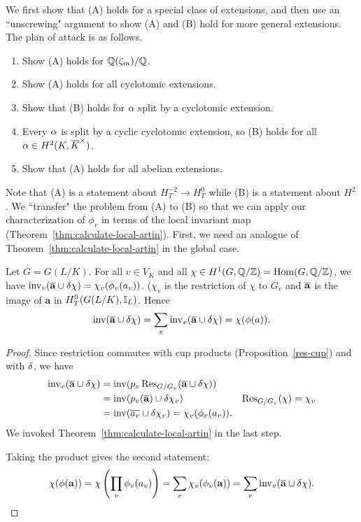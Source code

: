 We first show that (A) holds for a special class of extensions, and then use an ``unscrewing" argument to show (A) and (B) hold for more general extensions. The plan of attack is as follows.
\begin{enumerate}
\item
Show (A) holds for $\mathbb{Q}(\zeta_m)/\mathbb{Q}$.
\item 
Show (A) holds for all cyclotomic extensions.
\item
Show that (B) holds for $\alpha$ split by a cyclotomic extension.
\item
Every $\alpha$ is split by a cyclic cyclotomic extension, so (B) holds for all $\alpha\in H^2(K,\overline{K}^{\times})$.
\item
Show that (A) holds for all abelian extensions.
\end{enumerate}
Note that (A) is a statement about $H_T^{-2}\to H_T^0$ while (B) is a statement about $H^2$. We ``transfer" the problem from (A) to (B) so that we can apply our characterization of $\phi_v$ in terms of the local invariant map (Theorem~\ref{thm:calculate-local-artin}). First, we need an analogue of Theorem~\ref{thm:calculate-local-artin} in the global case.
\begin{lem}
Let $G=G(L/K)$. 
For all $v\in V_K$ and all $\chi\in H^1(G,\mathbb{Q}/\mathbb{Z})=\operatorname{Hom}(G,\mathbb{Q}/\mathbb{Z})$, we have $\operatorname{inv}_v(\overline{\mathbf a}\cup \delta \chi)=\chi_v(\phi_v(a_v))$. ($\chi_v$ is the restriction of $\chi$ to $G_v$ and $\overline{\mathbf a}$ is the image of $\mathbf a$ in $H_T^0(G(L/K),\mathbb{I}_L)$. Hence
\[
\operatorname{inv}(\overline{\mathbf a}\cup \delta \chi)=\sum_v \operatorname{inv}_v(\overline{\mathbf a}\cup \delta \chi)=\chi(\phi(a)).
\]
\end{lem}
\begin{proof}
Since restriction commutes with cup products (Proposition~\ref{res-cup}) and with $\delta$, we have
\begin{align*}
\operatorname{inv}_v(\overline{\mathbf a}\cup \delta \chi)&=\operatorname{inv}(p_v\operatorname{Res}_{G/G_v} (\overline{\mathbf a}\cup \delta \chi))\\
&=\operatorname{inv}(p_v(\overline{\mathbf a})\cup \delta\chi_v)&\operatorname{Res}_{G/G_v}(\chi)=\chi_v\\
&=\operatorname{inv}(\overline{a_v}\cup \delta \chi_v)=\chi_v(\phi_v(a_v)).
\end{align*}
We invoked Theorem~\ref{thm:calculate-local-artin}  in the last step.

Taking the product gives the second statement:
\[
\chi(\phi(\mathbf a))=\chi\left( {\prod_v \phi_v(a_v)} \right)=\sum_v\chi_v(\phi_v(\mathbf a))=\sum_v \operatorname{inv}_v(\overline{\mathbf a}\cup \delta\chi).
\]
\end{proof}
